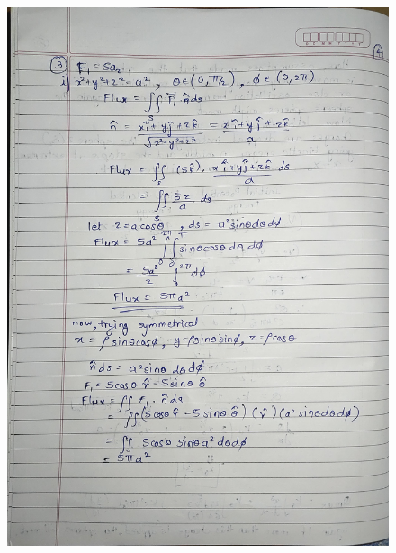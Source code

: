 \documentclass{article}
\begin{document}
\begin{figure}[H]
    \centering
    \includegraphics[width=\textwidth]{figs/written/4.jpg}
\end{figure}
\end{document}
